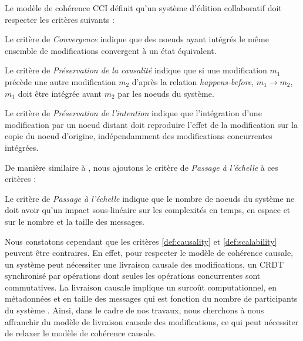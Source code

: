 \begin{definition}
  Le modèle de cohérence \ac{CCI} définit qu'un système d'édition collaboratif doit respecter les critères suivants :
  \begin{subdefinition}[Convergence]
    Le critère de \emph{Convergence} indique que des noeuds ayant intégrés le même ensemble de modifications convergent à un état équivalent.
  \end{subdefinition}
  \begin{subdefinition}
    \label{def:causality}
    Le critère de \emph{Préservation de la causalité} indique que si une modification $m_1$ précède une autre modification $m_2$ d'après la relation \emph{happens-before}, \ie $m_1 \rightarrow m_2$, $m_1$ doit être intégrée avant $m_2$ par les noeuds du système.
  \end{subdefinition}
  \begin{subdefinition}
    Le critère de \emph{Préservation de l'intention} indique que l'intégration d'une modification par un noeud distant doit reproduire l'effet de la modification sur la copie du noeud d'origine, indépendamment des modifications concurrentes intégrées.
  \end{subdefinition}
\end{definition}

De manière similaire à \cite{2009-logoot-weiss}, nous ajoutons le critère de \emph{Passage à l'échelle} à ces critères :

\begin{definition}
  \label{def:scalability}
  Le critère de \emph{Passage à l'échelle} indique que le nombre de noeuds du système ne doit avoir qu'un impact sous-linéaire sur les complexités en temps, en espace et sur le nombre et la taille des messages.
\end{definition}

Nous constatons cependant que les critères \ref{def:causality} et \ref{def:scalability} peuvent être contraires.
En effet, pour respecter le modèle de cohérence causale, un système peut nécessiter une livraison causale des modifications, \eg un \ac{CRDT} synchronisé par opérations dont seules les opérations concurrentes sont commutatives.
La livraison causale implique un surcoût computationnel, en métadonnées et en taille des messages qui est fonction du nombre de participants du système \cite{1991-concerning-size-logical-clocks-charron-bost}.
Ainsi, dans le cadre de nos travaux, nous cherchons à nous affranchir du modèle de livraison causale des modifications, ce qui peut nécessiter de relaxer le modèle de cohérence causale.

